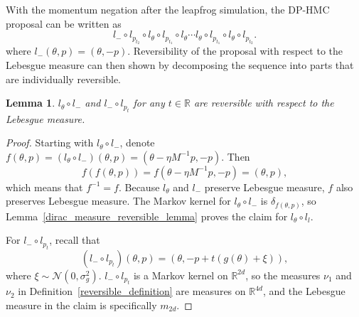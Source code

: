\documentclass[english,twoside,openright]{HYgraduMLDS}
\newtheorem{lemma}{Lemma}[chapter]
\newcommand{\R}{\mathbb{R}}
\newcommand{\caln}{{\mathcal{N}}}
\begin{document}
With the momentum negation after the leapfrog simulation, the DP-HMC proposal
can be written as
\[
  l_{-}\circ l_{p_{t_{2}}}\circ l_{\theta}\circ l_{p_{t_{1}}}\circ l_{\theta}\dotsb
  l_{\theta}\circ l_{p_{t_{1}}}\circ l_{\theta}\circ l_{p_{t_{2}}}.
\]
where \(l_{-}(\theta, p) = (\theta, -p)\). Reversibility of the proposal
with respect to the Lebesgue measure can then shown by
decomposing the sequence into parts that are individually reversible.

\begin{lemma}\label{leapfrog_step_reversible_lemma}
  \(l_{\theta}\circ l_{-}\) and \(l_{-}\circ l_{p_{t}}\) for any \(t\in \R\)
  are reversible with respect to the Lebesgue measure.
\end{lemma}
\begin{proof}
  Starting with \(l_{\theta}\circ l_{-}\), denote
  \(f(\theta, p) = (l_{\theta}\circ l_{-})(\theta, p)
  = (\theta - \eta M^{-1}p, -p)\). Then
  \[
    f(f(\theta, p)) = f(\theta - \eta M^{-1}p, -p) = (\theta, p),
  \]
  which means that \(f^{-1} = f\). Because \(l_{\theta}\) and \(l_{-}\) preserve
  Lebesgue measure, \(f\) also preserves Lebesgue measure.
  The Markov kernel for \(l_{\theta}\circ l_{-}\) is \(\delta_{f(\theta, p)}\),
  so Lemma~\ref{dirac_measure_reversible_lemma} proves the claim for
  \(l_{\theta}\circ l_{l}\).

  For \(l_{-}\circ l_{p_{t}}\), recall that
  \[
    (l_{-}\circ l_{p_{t}})(\theta, p) = (\theta, -p + t(g(\theta) + \xi)),
  \]
  where \(\xi \sim \caln(0, \sigma_{g}^{2})\).
  \(l_{-}\circ l_{p_{t}}\) is a Markov kernel on \(\R^{2d}\),
  so the measures \(\nu_{1}\) and \(\nu_{2}\) in
  Definition~\ref{reversible_definition} are measures on \(\R^{4d}\), and
  the Lebesgue measure in the claim is specifically \(m_{2d}\).


\end{proof}
\end{document}
